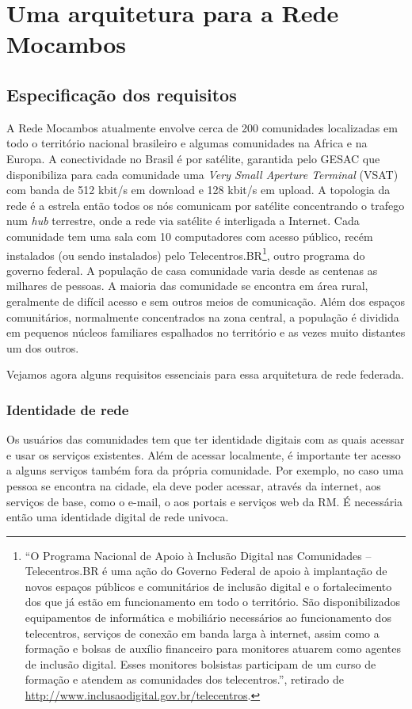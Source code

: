 
\chapter{Uma arquitetura para a Rede Mocambos}
\label{Capitolo3}

\section{Especificação dos requisitos}
A Rede Mocambos atualmente envolve cerca de 200 comunidades
localizadas em todo o território nacional brasileiro e algumas
comunidades na Africa e na Europa. A conectividade no Brasil é por
satélite, garantida pelo GESAC que disponibiliza para cada comunidade
uma \emph{Very Small Aperture Terminal} (VSAT) com banda de 512 kbit/s
em download e 128 kbit/s em upload. A topologia da rede é a estrela
então todos os nós comunicam por satélite concentrando o trafego num
\emph{hub} terrestre, onde a rede via satélite é interligada a
Internet. Cada comunidade tem uma sala com 10 computadores com acesso
público, recém instalados (ou sendo instalados) pelo
Telecentros.BR\footnote{``O Programa Nacional de Apoio à Inclusão
  Digital nas Comunidades – Telecentros.BR é uma ação do Governo
  Federal de apoio à implantação de novos espaços públicos e
  comunitários de inclusão digital e o fortalecimento dos que já estão
  em funcionamento em todo o território. São disponibilizados
  equipamentos de informática e mobiliário necessários ao
  funcionamento dos telecentros, serviços de conexão em banda larga à
  internet, assim como a formação e bolsas de auxílio financeiro para
  monitores atuarem como agentes de inclusão digital. Esses monitores
  bolsistas participam de um curso de formação e atendem as
  comunidades dos telecentros.'', retirado de
  \url{http://www.inclusaodigital.gov.br/telecentros}.}, outro
programa do governo federal. A população de casa comunidade varia
desde as centenas as milhares de pessoas. A maioria das comunidade se
encontra em área rural, geralmente de difícil acesso e sem outros
meios de comunicação. Além dos espaços comunitários, normalmente
concentrados na zona central, a população é dividida em pequenos
núcleos familiares espalhados no território e as vezes muito distantes
um dos outros.

Vejamos agora alguns requisitos essenciais para essa arquitetura de
rede federada.

\subsection{Identidade de rede}
Os usuários das comunidades tem que ter identidade digitais com as
quais acessar e usar os serviços existentes. Além de acessar
localmente, é importante ter acesso a alguns serviços também fora da
própria comunidade. Por exemplo, no caso uma pessoa se encontra na
cidade, ela deve poder acessar, através da internet, aos serviços de
base, como o e-mail, o aos portais e serviços web da RM. É necessária
então uma identidade digital de rede univoca. 

